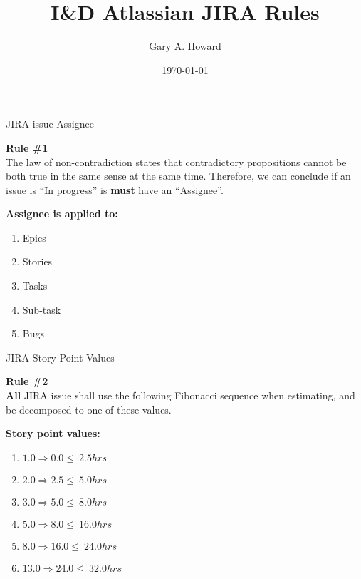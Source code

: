 \documentclass[10pt]{beamer}
\title{I\&D Atlassian JIRA Rules}
\date{\today}
\author{Gary A. Howard}
\begin{document}

\begin{frame}
\titlepage%
\end{frame}


\begin{frame}{JIRA issue Assignee}%
  \begin{mdframed}[style=HavasuLightBlueStyle]%
    \textbf{Rule \#1}\\%
    The law of non-contradiction states that contradictory propositions cannot
    be both true in the same sense at the same time.  Therefore, we can conclude
    if an issue is ``In progress'' is \textbf{must} have an ``Assignee''.
  \end{mdframed}%
  \begin{mdframed}[style=HavasuLightGreenStyle]%
    \textbf{Assignee is applied to:}%
    \begin{enumerate}%
      \item Epics%
      \item Stories%
      \item Tasks%
      \item Sub-task%
      \item Bugs%
    \end{enumerate}%
  \end{mdframed}%
\end{frame}%


\begin{frame}{JIRA Story Point Values}%
  \begin{mdframed}[style=HavasuLightBlueStyle]%
    \textbf{Rule \#2}\\%
    \textbf{All} JIRA issue shall use the following Fibonacci sequence when
    estimating, and be decomposed to one of these values.
  \end{mdframed}%
  \begin{mdframed}[style=HavasuLightGreenStyle]%
    \textbf{Story point values:}%
    \begin{enumerate}%
      \item  $1.0 \Rightarrow  0.0 \leq\  2.5 hrs$%
      \item  $2.0 \Rightarrow  2.5 \leq\  5.0 hrs$%
      \item  $3.0 \Rightarrow  5.0 \leq\  8.0 hrs$%
      \item  $5.0 \Rightarrow  8.0 \leq\ 16.0 hrs$%
      \item  $8.0 \Rightarrow 16.0 \leq\ 24.0 hrs$%
      \item $13.0 \Rightarrow 24.0 \leq\ 32.0 hrs$%
    \end{enumerate}%
  \end{mdframed}%
\end{frame}%
\end{document}
